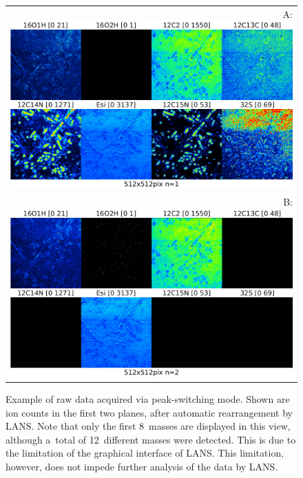\begin{figure}[!ht]
\centering
\begin{tabular}{r}
A: \includegraphics[scale=0.6, valign=t]{figs8/m-001}
\\
B: \includegraphics[scale=0.6, valign=t]{figs8/m-002}
\end{tabular}
\caption{\label{fig:LANS-8plus-frames}%
Example of raw data acquired via peak-switching mode. Shown are ion counts in the first two planes, after automatic rearrangement by LANS. Note that only the first 8~masses are displayed in this view, although a~total of 12~different masses were detected. This is due to the limitation of the  graphical interface of LANS. This limitation, however, does not impede further analysis of the data by LANS.}
\end{figure}


